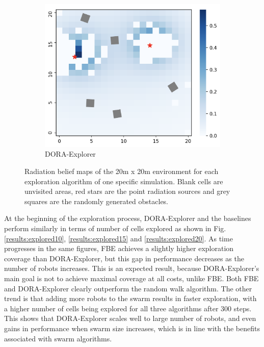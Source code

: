 \documentclass[letterpaper, 10 pt, conference]{ieeeconf}
\begin{document}
\begin{figure}
    \begin{subfigure}{0.32\textwidth}
        \includegraphics[width=\textwidth]{images/heatmap_dora.png}
        \caption{DORA-Explorer}
        \label{results:beliefdora}
    \end{subfigure}
    \caption{Radiation belief maps of the 20m x 20m environment for each exploration algorithm of one specific simulation. Blank cells are unvisited areas, red stars are the point radiation sources and grey squares are the randomly generated obstacles.}
    \label{results:belief}
\end{figure}

At the beginning of the exploration process, DORA-Explorer and the baselines
perform similarly in terms of number of cells explored as shown in
Fig. \ref{results:explored10}, \ref{results:explored15} and
\ref{results:explored20}. As time progresses in the same figures, FBE
achieves a slightly higher exploration coverage than DORA-Explorer, but this
gap in performance decreases as the number of robots increases. This
is an expected result, because DORA-Explorer's main goal is not to achieve
maximal coverage at all costs, unlike FBE. Both FBE and DORA-Explorer clearly
outperform the random walk algorithm. The other trend is that adding
more robots to the swarm results in faster exploration, with a higher
number of cells being explored for all three algorithms after 300
steps. This shows that DORA-Explorer scales well to large number of robots, and
even gains in performance when swarm size increases, which is in line
with the benefits associated with swarm algorithms.
\end{document}

